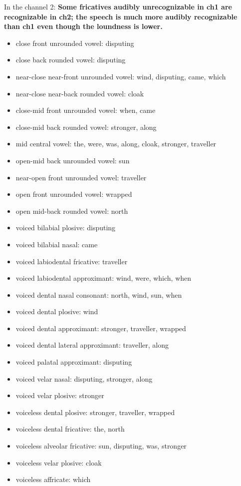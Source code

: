 \documentclass{../labbook}
\begin{document}
\begin{solution}
In the channel 2: \textbf{Some fricatives audibly unrecognizable in ch1 are recognizable in ch2; the speech is much more audibly recognizable than ch1 even though the loundness is lower.}
\begin{itemize}
    \item close front unrounded vowel: disputing
    \item close back rounded vowel: disputing
    \item near-close near-front unrounded vowel: wind, disputing, came, which
    \item near-close near-back rounded vowel: cloak
    \item close-mid front unrounded vowel: when, came
    \item close-mid back rounded vowel: stronger, along
    \item mid central vowel: the, were, was, along, cloak, stronger, traveller
    \item open-mid back unrounded vowel: sun
    \item near-open front unrounded vowel: traveller
    \item open front unrounded vowel: wrapped 
    \item open mid-back rounded vowel: north
    \item voiced bilabial plosive: disputing
    \item voiced bilabial nasal: came
    \item voiced labiodental fricative: traveller
    \item voiced labiodental approximant: wind, were, which, when
    \item voiced dental nasal consonant: north, wind, sun, when
    \item voiced dental plosive: wind
    \item voiced dental approximant: stronger, traveller, wrapped
    \item voiced dental lateral approximant: traveller, along
    \item voiced palatal approximant: disputing
    \item voiced velar nasal: disputing, stronger, along
    \item voiced velar plosive: stronger
    \item voiceless dental plosive: stronger, traveller, wrapped 
    \item voiceless dental fricative: the, north
    \item voiceless alveolar fricative: sun, disputing, was, stronger
    \item voiceless velar plosive: cloak       
    \item voiceless affricate: which
\end{itemize}


\end{solution}
\end{document}
